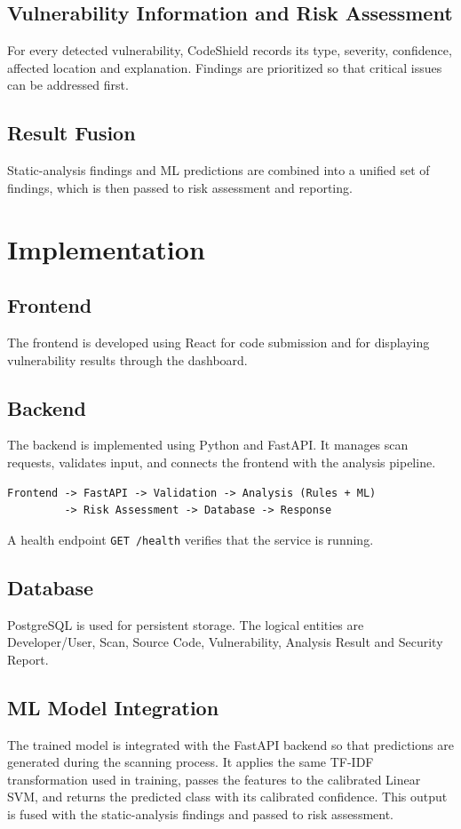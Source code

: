 \documentclass[12pt,a4paper]{report}
\begin{document}
\section{Vulnerability Information and Risk Assessment}
For every detected vulnerability, CodeShield records its type, severity, confidence, affected location and explanation. Findings are prioritized so that critical issues can be addressed first.

\section{Result Fusion}
Static-analysis findings and ML predictions are combined into a unified set of findings, which is then passed to risk assessment and reporting.

\chapter{Implementation}

\section{Frontend}
The frontend is developed using React for code submission and for displaying vulnerability results through the dashboard.

\section{Backend}
The backend is implemented using Python and FastAPI. It manages scan requests, validates input, and connects the frontend with the analysis pipeline.
\begin{lstlisting}
Frontend -> FastAPI -> Validation -> Analysis (Rules + ML)
         -> Risk Assessment -> Database -> Response
\end{lstlisting}
A health endpoint \texttt{GET /health} verifies that the service is running.

\section{Database}
PostgreSQL is used for persistent storage. The logical entities are Developer/User, Scan, Source Code, Vulnerability, Analysis Result and Security Report.

\section{ML Model Integration}
The trained model is integrated with the FastAPI backend so that predictions are generated during the scanning process. It applies the same TF-IDF transformation used in training, passes the features to the calibrated Linear SVM, and returns the predicted class with its calibrated confidence. This output is fused with the static-analysis findings and passed to risk assessment.
\end{document}
